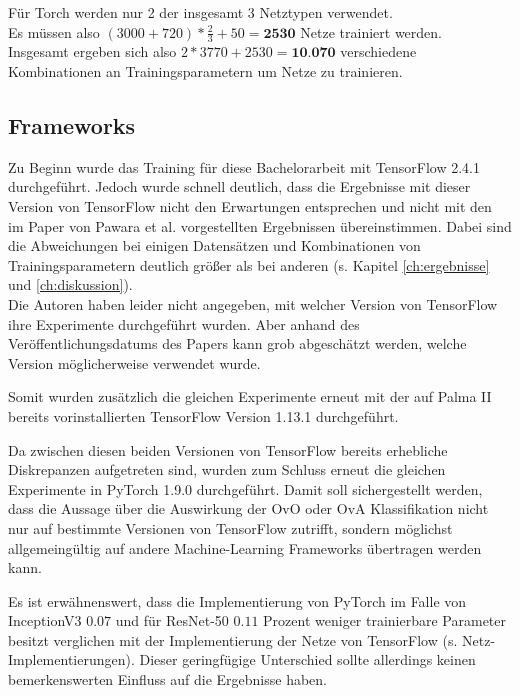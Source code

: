 Für Torch \cite{pytorch} werden nur 2 der insgesamt 3 Netztypen verwendet.\\
Es müssen also $(3000 + 720) * \frac{2}{3} + 50 = \textbf{2530}$ Netze trainiert werden.\\

Insgesamt ergeben sich also $2 * 3770 + 2530 = \textbf{10.070}$ verschiedene Kombinationen an Trainingsparametern um Netze zu trainieren.

\subsection{Frameworks}
Zu Beginn wurde das Training für diese Bachelorarbeit mit TensorFlow 2.4.1 \cite{tensorflow} durchgeführt. Jedoch wurde schnell deutlich, dass die Ergebnisse mit dieser Version von TensorFlow \cite{tensorflow} nicht den Erwartungen entsprechen und nicht mit den im Paper von Pawara et al. \cite{pawaraPaper} vorgestellten Ergebnissen übereinstimmen. Dabei sind die Abweichungen bei einigen Datensätzen und Kombinationen von Trainingsparametern deutlich größer als bei anderen (s. Kapitel \ref{ch:ergebnisse} und \ref{ch:diskussion}). \\

Die Autoren haben leider nicht angegeben, mit welcher Version von TensorFlow \cite{tensorflow} ihre Experimente durchgeführt wurden. Aber anhand des\\ Veröffentlichungsdatums des Papers \cite{pawaraPaper} kann grob abgeschätzt werden, welche Version möglicherweise verwendet wurde.

Somit wurden zusätzlich die gleichen Experimente erneut mit der auf Palma II \cite{palma2} bereits vorinstallierten TensorFlow \cite{tensorflow} Version 1.13.1 durchgeführt.

Da zwischen diesen beiden Versionen von TensorFlow \cite{tensorflow} bereits erhebliche Diskrepanzen aufgetreten sind, wurden zum Schluss erneut die gleichen Experimente in PyTorch 1.9.0 \cite{pytorch} durchgeführt.
Damit soll sichergestellt werden, dass die Aussage über die Auswirkung der OvO oder OvA Klassifikation nicht nur auf bestimmte Versionen von TensorFlow \cite{tensorflow} zutrifft, sondern möglichst allgemeingültig auf andere Machine-Learning Frameworks übertragen werden kann.

Es ist erwähnenswert, dass die Implementierung von PyTorch \cite{pytorch} im Falle von InceptionV3 $0.07$ und für ResNet-50 $0.11$ Prozent weniger trainierbare Parameter besitzt verglichen mit der Implementierung der Netze von TensorFlow \cite{tensorflow} (s. \cite{githubRepo} Netz-Implementierungen). Dieser geringfügige Unterschied sollte allerdings keinen bemerkenswerten Einfluss auf die Ergebnisse haben.


